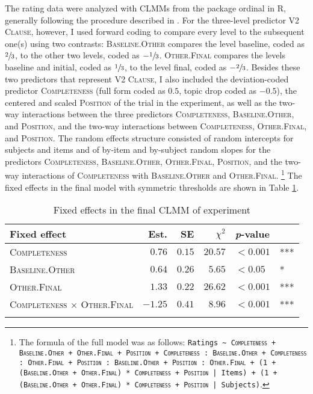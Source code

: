 The rating data were analyzed with CLMMs from the package ordinal \citep{christensen2019} in R, generally following the procedure described in .
For the three-level predictor \textsc{V2 Clause}, however, I used forward coding to compare every level to the subsequent one(s) using two contrasts:
\textsc{Baseline.Other} compares the level baseline, coded as $\sfrac{2}{3}$, to the other two levels, coded as $-\sfrac{1}{3}$.
\textsc{Other.Final} compares the levels baseline and initial, coded as $\sfrac{1}{3}$, to the level final, coded as $-\sfrac{2}{3}$.
Besides these two predictors that represent \textsc{V2 Clause}, I also included the deviation-coded predictor \textsc{Completeness} (full form coded as $0.5$, topic drop coded as $-0.5$), the centered and scaled \textsc{Position} of the trial in the experiment, as well as the two-way interactions between the three predictors \textsc{Completeness}, \textsc{Baseline.Other}, and \textsc{Position}, and the two-way interactions between \textsc{Completeness}, \textsc{Other.Final}, and \textsc{Position}.
The random effects structure consisted of random intercepts for subjects and items and of by-item and by-subject random slopes for the predictors \textsc{Completeness}, \textsc{Baseline.Other}, \textsc{Other.Final}, \textsc{Position}, and the two-way interactions of \textsc{Completeness} with \textsc{Baseline.Other} and \textsc{Other.Final}.%
\footnote{The formula of the full model was as follows: \texttt{Ratings \textasciitilde ~\textsc{Completeness} + \textsc{Baseline.Other} + \textsc{Other.Final} + \textsc{Position} + \textsc{Completeness} : \textsc{Baseline.Other} + \textsc{Completeness} :  \textsc{Other.Final} + \textsc{Position} : \textsc{Baseline.Other} + \textsc{Position} : \textsc{Other.Final} + (1 + (\textsc{Baseline.Other} + \textsc{Other.Final}) * \textsc{Completeness} + \textsc{Position} | Items) + (1 + (\textsc{Baseline.Other} + \textsc{Other.Final}) * \textsc{Completeness} + \textsc{Position}  | Subjects)}.}
%
The fixed effects in the final model with symmetric thresholds are shown in Table \ref{tab:embedded.model}.

\begin{table}
\caption{Fixed effects in the final CLMM of experiment }
\centering
\begin{tabular}{lrrrll}
\lsptoprule
Fixed effect & Est. & SE & $\chi^2$ & \textit{p}-value &   \\
\midrule
\textsc{Completeness} & $0.76$ & $0.15$ & $20.57$ & $< 0.001$ & ***\\
\textsc{Baseline.Other} & $0.64$ & $0.26$ & $5.65$ & $< 0.05$ & *\\
\textsc{Other.Final} & $1.33$ & $0.22$ & $26.62$ & $< 0.001$ & ***\\
\textsc{Completeness $\times$ Other.Final} & $-1.25$ & $0.41$ & $8.96$ & $< 0.001$ & ***\\
\lspbottomrule
\end{tabular}
\label{tab:embedded.model}
\end{table}

